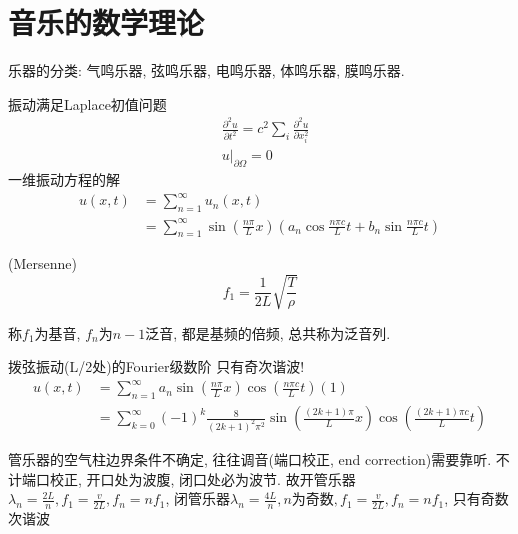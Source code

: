 \documentclass{article}
\begin{document}
\section{音乐的数学理论}
\begin{flushleft}
    乐器的分类: 气鸣乐器, 弦鸣乐器, 电鸣乐器, 体鸣乐器, 膜鸣乐器.

    振动满足Laplace初值问题
    \begin{equation}
        \begin{aligned}
            &\frac{\partial^2 u}{\partial t^2} = c^2 \sum_{i} \frac{\partial^2 u}{\partial x_i^2}\\
            &u|_{\partial \Omega} = 0
        \end{aligned}
    \end{equation}
    一维振动方程的解
    \begin{equation}
        \begin{aligned}
        u(x, t) &=\sum_{n=1}^{\infty} u_{n}(x, t) \\
        &=\sum_{n=1}^{\infty} \sin \left(\frac{n \pi}{L} x\right)\left(a_{n} \cos \frac{n \pi c}{L} t+b_{n} \sin \frac{n \pi c}{L} t\right)
        \end{aligned}
    \end{equation}

    \begin{theorem}
        (Mersenne) $$f_1=\frac{1}{2L}\sqrt{\frac{T}{\rho}}$$
    \end{theorem}

    称$f_1$为基音, $f_n$为$n-1$泛音, 都是基频的倍频, 总共称为泛音列.

    拨弦振动(L/2处)的Fourier级数阶 \trarr 只有奇次谐波!
    \begin{equation}
        \begin{aligned}
        u(x, t) &=\sum_{n=1}^{\infty} a_{n} \sin \left(\frac{n \pi}{L} x\right) \cos \left(\frac{n \pi c}{L} t\right)(1) \\
        &=\sum_{k=0}^{\infty}(-1)^{k} \frac{8}{(2 k+1)^{2} \pi^{2}} \sin \left(\frac{(2 k+1) \pi}{L} x\right) \cos \left(\frac{(2 k+1) \pi c}{L} t\right)
        \end{aligned}
    \end{equation}

    管乐器的空气柱边界条件不确定, 往往调音(端口校正, end correction)需要靠听. 不计端口校正, 开口处为波腹, 闭口处必为波节. 故开管乐器$\lambda_n=\frac{2L}{n}, f_1=\frac{v}{2L}, f_n=nf_1$, 闭管乐器$\lambda_n=\frac{4L}{n}, n\text{为奇数}, f_1=\frac{v}{2L}, f_n=nf_1$, 只有奇数次谐波


\end{flushleft}
\end{document}
